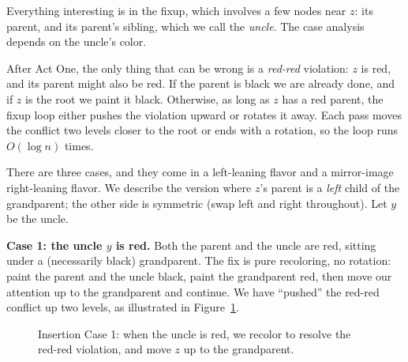 Everything interesting is in the fixup, which involves a few nodes near $z$: its
parent, and its parent's sibling, which we call the \emph{uncle}. The case
analysis depends on the uncle's color.

\begin{focusbox}
After Act One, the only thing that can be wrong is a \emph{red-red} violation:
$z$ is red, and its parent might also be red. If the parent is black we are
already done, and if $z$ is the root we paint it black. Otherwise, as
long as $z$ has a red parent, the fixup loop either pushes the violation upward
or rotates it away. Each pass moves the conflict two levels closer to the root
or ends with a rotation, so the loop runs $O(\log n)$ times.
\end{focusbox}

There are three cases, and they come in a left-leaning flavor and a mirror-image
right-leaning flavor. We describe the version where $z$'s parent is a \emph{left}
child of the grandparent; the other side is symmetric (swap left and right
throughout). Let $y$ be the uncle.

\textbf{Case 1: the uncle $y$ is red.} Both the parent and the uncle are red,
sitting under a (necessarily black) grandparent. The fix is pure recoloring, no
rotation: paint the parent and the uncle black, paint the grandparent red, then
move our attention up to the grandparent and continue. We have ``pushed'' the
red-red conflict up two levels, as illustrated in Figure~\ref{fig:insert-case-1}.

\begin{figure}[htbp]
\centering
{}
\caption{Insertion Case 1: when the uncle is red, we recolor to resolve the red-red violation, and move $z$ up to the grandparent.}
\label{fig:insert-case-1}
\end{figure}

